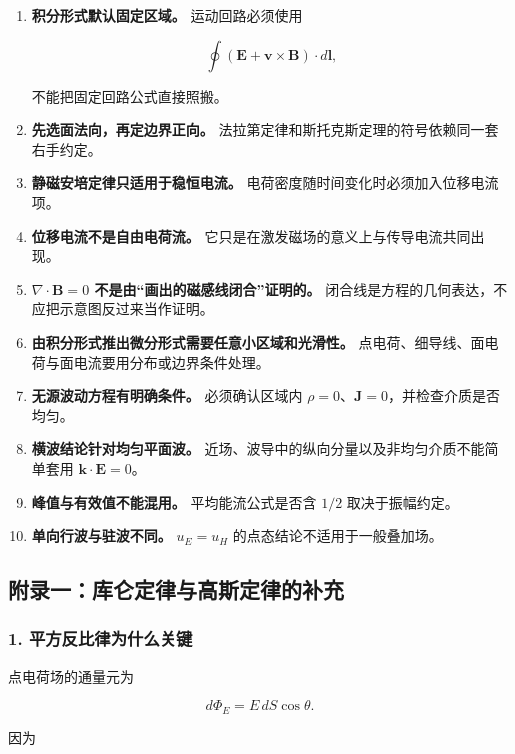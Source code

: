 \begin{enumerate}
\def\labelenumi{\arabic{enumi}.}
\item
  \textbf{积分形式默认固定区域。} 运动回路必须使用

  \[
  \oint(\mathbf E+\mathbf v\times\mathbf B)\cdot d\mathbf l,
  \]

  不能把固定回路公式直接照搬。
\item
  \textbf{先选面法向，再定边界正向。}
  法拉第定律和斯托克斯定理的符号依赖同一套右手约定。
\item
  \textbf{静磁安培定律只适用于稳恒电流。}
  电荷密度随时间变化时必须加入位移电流项。
\item
  \textbf{位移电流不是自由电荷流。}
  它只是在激发磁场的意义上与传导电流共同出现。
\item
  \textbf{\(\nabla\cdot\mathbf B=0\) 不是由``画出的磁感线闭合''证明的。}
  闭合线是方程的几何表达，不应把示意图反过来当作证明。
\item
  \textbf{由积分形式推出微分形式需要任意小区域和光滑性。}
  点电荷、细导线、面电荷与面电流要用分布或边界条件处理。
\item
  \textbf{无源波动方程有明确条件。} 必须确认区域内
  \(\rho=0\)、\(\mathbf J=0\)，并检查介质是否均匀。
\item
  \textbf{横波结论针对均匀平面波。}
  近场、波导中的纵向分量以及非均匀介质不能简单套用
  \(\mathbf k\cdot\mathbf E=0\)。
\item
  \textbf{峰值与有效值不能混用。} 平均能流公式是否含 \(1/2\)
  取决于振幅约定。
\item
  \textbf{单向行波与驻波不同。} \(u_E=u_H\)
  的点态结论不适用于一般叠加场。
\end{enumerate}

\subsection{附录一：库仑定律与高斯定律的补充}\label{m7:ux9644ux5f55ux4e00ux5e93ux4ed1ux5b9aux5f8bux4e0eux9ad8ux65afux5b9aux5f8bux7684ux8865ux5145}

\subsubsection{1.
平方反比律为什么关键}\label{m7:ux5e73ux65b9ux53cdux6bd4ux5f8bux4e3aux4ec0ux4e48ux5173ux952e}

点电荷场的通量元为

\[
d\Phi_E
=E\,dS\cos\theta.
\]

因为

